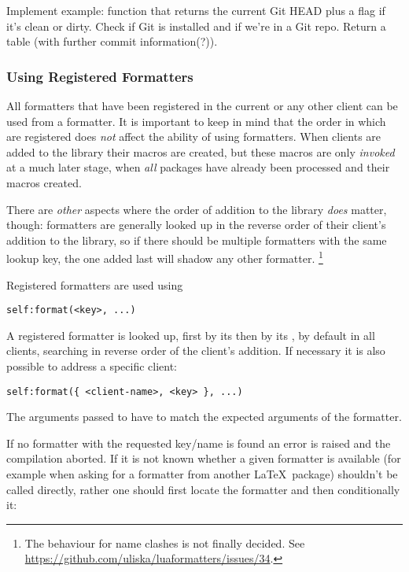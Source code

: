 \documentclass[12pt]{scrartcl}
\begin{document}
 Implement example: function that returns the current Git HEAD plus a flag if it's clean or dirty. Check if Git is installed and if we're in a Git repo. Return a table (with further commit information(?)).



\subsubsection{Using Registered Formatters}
\label{sec:advanced:modular:formatters}

All formatters that have been registered in the current or any other client can
be used from a formatter.  It is important to keep in mind that the order in
which  are registered does \emph{not} affect the ability
of using formatters.  When clients are added to the library their macros are
created, but these macros are only \emph{invoked} at a much later stage, when
\emph{all} packages have already been processed and their macros created.

There are \emph{other} aspects where the order of addition to the library
\emph{does} matter, though:  formatters are generally looked up in the reverse
order of their client's addition to the library, so if there should be multiple
formatters with the same lookup key, the one added last will shadow any other
formatter.%
\footnote{ The behaviour for name clashes is not finally decided.
See \url{https://github.com/uliska/luaformatters/issues/34}.}

Registered formatters are used using

\begin{verbatim}
self:format(<key>, ...)
\end{verbatim}

A registered formatter is looked up, first by its  then by its , by default in all clients, searching in reverse order of the client's addition.  If necessary it is also possible to address a specific client:

\begin{verbatim}
self:format({ <client-name>, <key> }, ...)
\end{verbatim}

\noindent The arguments passed to  have to match the expected arguments of the formatter.

If no formatter with the requested key/name is found an error is raised and the
compilation aborted.  If it is not known whether a given formatter is available
(for example when asking for a formatter from another \LaTeX\ package)
 shouldn't be called directly, rather one should first locate
the formatter and then conditionally  it:
\end{document}
